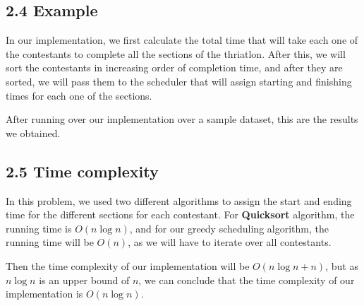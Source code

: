 \documentclass{article}
\begin{document}
\subsection*{2.4 Example}

In our implementation, we first calculate the total time that will take each one of the contestants to complete all the sections of the thriatlon. After this, we will sort the contestants in increasing order of completion time, and after they are sorted, we will pass them to the scheduler that will assign starting and finishing times for each one of the sections.



After running over our implementation over a sample dataset, this are the results we obtained.



\subsection*{2.5 Time complexity}
In this problem, we used two different algorithms to assign the start and ending time for the different sections for each contestant. For \textbf{Quicksort} algorithm, the running time is $O(n\log n)$, and for our greedy scheduling algorithm, the running time will be $O(n)$, as we will have to iterate over all contestants.

Then the time complexity of our implementation will be $O(n\log n + n)$, but as $n\log n$ is an upper bound of $n$, we can conclude that the time complexity of our implementation is $O(n\log n)$.
\end{document}
